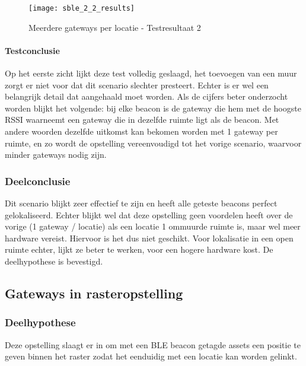 \begin{figure}[h]
	\texttt{[image: sble\_2\_2\_results]}
	\caption{Meerdere gateways per locatie - Testresultaat 2}
	\label{fig:ond-ble-static-2-2-res}
\end{figure}

\paragraph{Testconclusie}
Op het eerste zicht lijkt deze test volledig geslaagd, het toevoegen van een muur zorgt er niet voor dat dit scenario slechter presteert. Echter is er wel een belangrijk detail dat aangehaald moet worden. Als de cijfers beter onderzocht worden blijkt het volgende: bij elke beacon is de gateway die hem met de hoogste RSSI waarneemt een gateway die in dezelfde ruimte ligt als de beacon. Met andere woorden dezelfde uitkomst kan bekomen worden met 1 gateway per ruimte, en zo wordt de opstelling vereenvoudigd tot het vorige scenario, waarvoor minder gateways nodig zijn.

\subsubsection{Deelconclusie}
Dit scenario blijkt zeer effectief te zijn en heeft alle geteste beacons perfect gelokaliseerd. Echter blijkt wel dat deze opstelling geen voordelen heeft over de vorige (1 gateway / locatie) als een locatie 1 ommuurde ruimte is, maar wel meer hardware vereist. Hiervoor is het dus niet geschikt. Voor lokalisatie in een open ruimte echter, lijkt ze beter te werken, voor een hogere hardware kost. De deelhypothese is bevestigd.

\subsection{Gateways in rasteropstelling}
\subsubsection{Deelhypothese}
Deze opstelling slaagt er in om met een BLE beacon getagde assets een positie te geven binnen het raster zodat het eenduidig met een locatie kan worden gelinkt.

